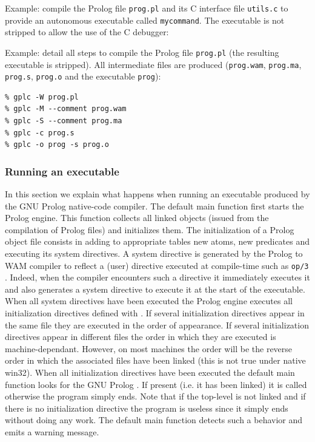 
Example: compile the Prolog file \texttt{prog.pl} and its C interface file
\texttt{utils.c} to provide an autonomous executable called
\texttt{mycommand}. The executable is not stripped to allow the use of the C
debugger:


Example: detail all steps to compile the Prolog file \texttt{prog.pl} (the
resulting executable is stripped). All intermediate files are produced
(\texttt{prog.wam}, \texttt{prog.ma}, \texttt{prog.s}, \texttt{prog.o} and
the executable \texttt{prog}):

\begin{Code}
\begin{verbatim}
% gplc -W prog.pl
% gplc -M --comment prog.wam
% gplc -S --comment prog.ma
% gplc -c prog.s
% gplc -o prog -s prog.o
\end{verbatim}
\end{Code}

\subsubsection{Running an executable}
\label{Running-an-executable}
In this section we explain what happens when running an executable produced
by the GNU Prolog native-code compiler. The default main function first starts
the Prolog engine. This function collects all linked objects (issued from the
compilation of Prolog files) and initializes them. The initialization of a
Prolog object file consists in adding to appropriate tables new atoms, new
predicates and executing its system directives. A system directive is
generated by the Prolog to WAM compiler to reflect a (user) directive
executed at compile-time such as \texttt{op/3} . Indeed, when the
compiler encounters such a directive it immediately executes it and also
generates a system directive to execute it at the start of the executable.
When all system directives have been executed the Prolog engine executes all
initialization directives defined with 
.  If several initialization directives appear in the
same file they are executed in the order of appearance. If several
initialization directives appear in different files the order in which they
are executed is machine-dependant. However, on most machines the order will
be the reverse order in which the associated files have been linked (this is
not true under native win32). When all initialization directives have been
executed the default main function looks for the GNU Prolog
. If present (i.e. it has been linked) it is called otherwise
the program simply ends. Note that if the top-level is not linked and if
there is no initialization directive the program is useless since it simply
ends without doing any work. The default main function detects such a
behavior and emits a warning message.

